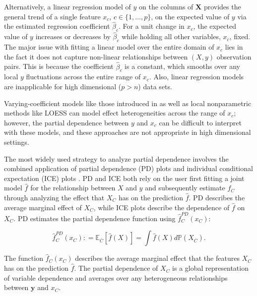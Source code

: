 \documentclass[12pt]{article}
\newcommand{\xnc}{$x_{\overline{c}}$}
\begin{document}
Alternatively, a linear regression model of $y$ on the columns of $\mathbf{X}$ provides the general trend of a single feature $x_c$, $c \in \{1, \ldots, p\}$, on the expected value of $y$ via the estimated regression coefficient $\widehat{\beta}_c$.  For a unit change in $x_c$, the expected value of $y$ increases or decreases by $\widehat{\beta}_c$ while holding all other variables, \xnc{},  fixed.  The major issue with fitting a linear model over the entire domain of $x_c$ lies in the fact it does not capture non-linear relationships between $(X,y)$ observation pairs. This is because the coefficient $\widehat{\beta}_c$ is a constant, which smooths over any local $y$ fluctuations across the entire range of $x_c$.  Also, linear regression models are inapplicable for high dimensional ($p > n$) data sets.

Varying-coefficient models like those introduced in \citet{fan2008statistical} as well as local nonparametric methods like LOESS \citep{cleveland1979robust, cleveland1981lowess, cleveland1988locally} can model effect heterogeneities across the range of $x_c$; however, the partial dependence between $y$ and $x_c$ can be difficult to interpret with these models, and these approaches are not appropriate in high dimensional settings. 

The most widely used strategy to analyze partial dependence involves the combined application of partial dependence (PD) plots \citep{PDP} and individual conditional expectation (ICE) plots \citep{ICE}. PD and ICE both rely on the user first fitting a joint model $\widehat{f}$ for the relationship between $X$ and $y$ and subsequently estimate $f_C$ through analyzing the effect that $X_C$ has on the prediction $\widehat{f}$. PD describes the average marginal effect of $X_C$, while ICE plots describe the dependence of $\widehat{f}$ on $X_C$. PD estimates the partial dependence function using $\widehat{f}^{PD}_C(x_C)$:

\begin{equation*}\label{eq:PD} \widehat{f}^{PD}_C(x_C): = \mathbb{E}_{\overline{C}}\left[\widehat{f}({X})\right] = \int \widehat{f}({X}) d\mathbb{P}(X_{\overline{C}}).\end{equation*}

\noindent The function $\widehat{f}_C(x_C)$ describes the average marginal effect that the features $X_C$ has on the prediction $\widehat{f}$. The partial dependence of $X_C$ is a global representation of variable dependence and averages over any heterogeneous relationships between $\mathbf{y}$ and $x_C$. 
\end{document}
